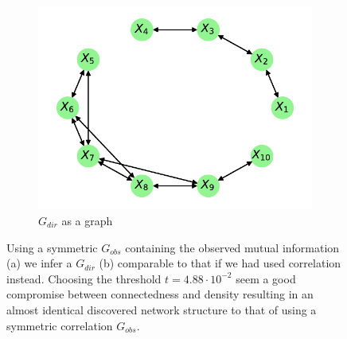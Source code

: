 \documentclass[../Thesis.tex]{subfiles}
\begin{document}
\begin{figure}[H]
\begin{subfigure}[t]{0.49\textwidth}
    \end{subfigure}
    \\[\baselineskip]
    \begin{subfigure}[t]{0.49\textwidth}
        \centering
        \includegraphics[width=.9\linewidth]{figures/Gaussian Chain Theoretical/Chain graph from symmetric G obs - MI - cutoff 4_88e-2.pdf}
        \caption{$G_{dir}$ as a graph}
    \end{subfigure}
    \caption{Using a symmetric $G_{obs}$ containing the observed mutual information (a) we infer a $G_{dir}$ (b) comparable to that if we had used correlation instead. Choosing the threshold $t = 4.88 \cdot 10^{-2}$ seem a good compromise between connectedness and density resulting in an almost identical discovered network structure to that of using a symmetric correlation $G_{obs}$.}
    \label{fig:Gaussian chain symmetric G_obs using mutual information}
\end{figure}






\newpage
\end{document}
